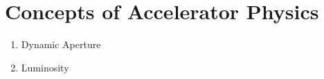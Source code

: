 \chapter{Concepts of Accelerator Physics}
\thumbforchapter{}
\chaptertoc{}
\newpage

\begin{enumerate}
    \color{red}
    \item Dynamic Aperture
    \item Luminosity
\end{enumerate}








